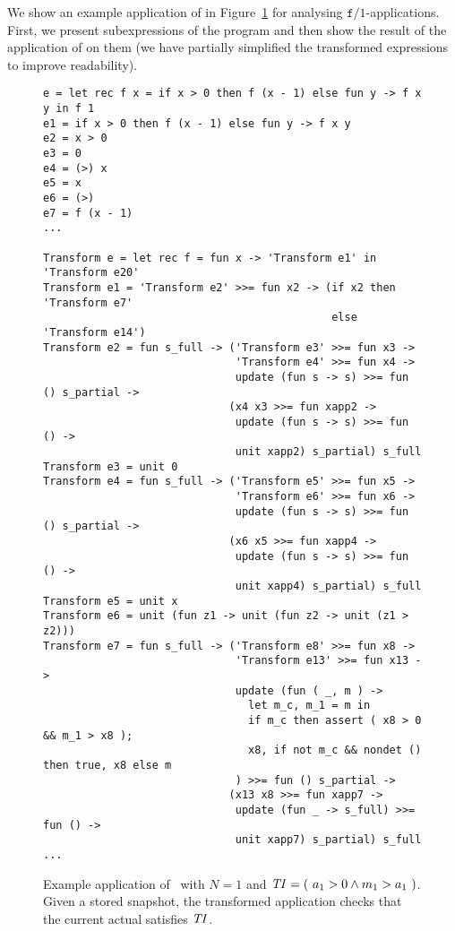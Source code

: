 We show an example application of \product in Figure~\ref{fig-ex-prod}
for analysing $\texttt{f}/1$-applications.
First, we present subexpressions of the program and then show the
result of the application of \product on them (we have partially
simplified the transformed expressions to improve readability).
%
\begin{figure}[!t]
  \centering
{
\small
\begin{verbatim}
e = let rec f x = if x > 0 then f (x - 1) else fun y -> f x y in f 1
e1 = if x > 0 then f (x - 1) else fun y -> f x y
e2 = x > 0
e3 = 0
e4 = (>) x
e5 = x
e6 = (>)
e7 = f (x - 1)
...

Transform e = let rec f = fun x -> 'Transform e1' in 'Transform e20'
Transform e1 = 'Transform e2' >>= fun x2 -> (if x2 then 'Transform e7'
                                             else 'Transform e14')
Transform e2 = fun s_full -> ('Transform e3' >>= fun x3 ->
                              'Transform e4' >>= fun x4 ->
                              update (fun s -> s) >>= fun () s_partial ->
                             (x4 x3 >>= fun xapp2 ->
                              update (fun s -> s) >>= fun () ->
                              unit xapp2) s_partial) s_full
Transform e3 = unit 0
Transform e4 = fun s_full -> ('Transform e5' >>= fun x5 ->
                              'Transform e6' >>= fun x6 ->
                              update (fun s -> s) >>= fun () s_partial ->
                             (x6 x5 >>= fun xapp4 ->
                              update (fun s -> s) >>= fun () ->
                              unit xapp4) s_partial) s_full
Transform e5 = unit x
Transform e6 = unit (fun z1 -> unit (fun z2 -> unit (z1 > z2)))
Transform e7 = fun s_full -> ('Transform e8' >>= fun x8 ->
                              'Transform e13' >>= fun x13 ->
                              update (fun ( _, m ) ->
                                let m_c, m_1 = m in
                                if m_c then assert ( x8 > 0 && m_1 > x8 );
                                x8, if not m_c && nondet () then true, x8 else m
                              ) >>= fun () s_partial ->
                             (x13 x8 >>= fun xapp7 ->
                              update (fun _ -> s_full) >>= fun () ->
                              unit xapp7) s_partial) s_full
...
\end{verbatim}
}
  \caption{Example application of \product\ with $N = 1$ and \mbox{$\mathit{TI} = (\
      a_1 > 0 \wedge m_1 > a_1 \ )$}. Given a stored snapshot, the
    transformed application \ttt{f (x - 1)} checks that the current
    actual satisfies $\mathit{TI}$.}
  \label{fig-ex-prod}
\end{figure}
%

